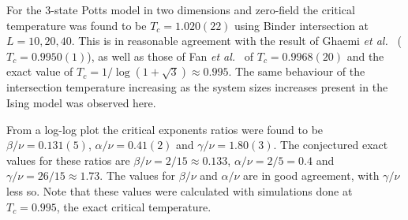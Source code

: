 \documentclass[11pt, a4paper]{report} %
\begin{document}
For the 3-state Potts model in two dimensions and zero-field the critical temperature was found to be \(T_c=1.020(22)\) using Binder intersection at \(L = 10, 20, 40\).
This is in reasonable agreement with the result of Ghaemi \textit{et al.}~\cite{ghaemi:2001} (\(T_c=0.9950(1)\)), as well as those of Fan \textit{et al.}~\cite{fan:2007} of \(T_c = 0.9968(20)\) and the exact value of \(T_c = 1/\log(1+\sqrt{3}) \approx 0.995\).
The same behaviour of the intersection temperature increasing as the system sizes increases present in the Ising model was observed here.

From a log-log plot the critical exponents ratios were found to be \(\beta/\nu = 0.131(5)\), \(\alpha/\nu = 0.41(2)\) and \(\gamma/\nu = 1.80(3)\).
The conjectured exact values for these ratios are \(\beta/\nu = 2/15 \approx 0.133\), \(\alpha/\nu = 2/5 =0.4\) and \(\gamma/\nu = 26/15 \approx 1.73\).
The values for \(\beta/\nu\) and \(\alpha/\nu\) are in good agreement, with \(\gamma/\nu\) less so.
Note that these values were calculated with simulations done at \(T_c=0.995\), the exact critical temperature.
\end{document}
